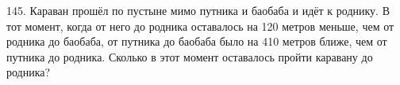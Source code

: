145. Караван прошёл по пустыне мимо путника и баобаба и идёт к роднику. В тот момент, когда от него до родника оставалось на 120 метров меньше, чем от родника до баобаба, от путника до баобаба было на 410 метров ближе, чем от путника до родника. Сколько в этот момент оставалось пройти каравану до родника?\\
